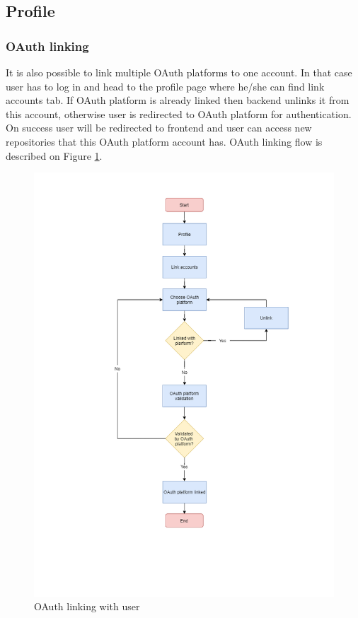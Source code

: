 \subsection{Profile}\label{subsec:profile}
\subsubsection{OAuth linking}\label{subsubsec:oauth-linking}
It is also possible to link multiple OAuth platforms to one account.
In that case user has to log in and head to the profile page where he/she can find link accounts tab.
If OAuth platform is already linked then backend unlinks it from this account, otherwise user is redirected to OAuth platform for authentication.
On success user will be redirected to frontend and user can access new repositories that this OAuth platform account has.
OAuth linking flow is described on Figure
\ref{fig:account-linking}.

\begin{figure}[h]
    \includegraphics[width=\textwidth]{figures/account_linking.png}
    \caption{OAuth linking with user}
    \label{fig:account-linking}
\end{figure}

